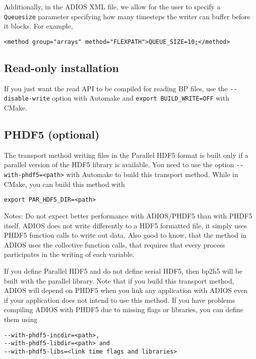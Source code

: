 Additionally, in the ADIOS XML file, we allow for the user to specify a \verb+Queuesize+ parameter specifying how many timesteps the writer can buffer before it blocks. For example, 

\begin{lstlisting}
<method group="arrays" method="FLEXPATH">QUEUE_SIZE=10;</method>
\end{lstlisting}



\subsection{Read-only installation}

If you just want the read API to be compiled for reading BP files, use the \verb+--disable-write+ option with Automake and \verb+export BUILD_WRITE=OFF+ with CMake.

\subsection{PHDF5 (optional)}

The transport method writing files in the Parallel HDF5 format is built only if 
a parallel version of the HDF5 library is available. You need to use the 
option \verb+--with-phdf5=<path>+ with Automake to build this transport method. 
While in CMake, you can build this method with
\begin{lstlisting}
export PAR_HDF5_DIR=<path>
\end{lstlisting}

\noindent Notes: Do not expect better performance with ADIOS/PHDF5 than with PHDF5 itself. ADIOS does not write differently to a HDF5 formatted file, it simply uses PHDF5 function calls to write out data. Also good to know, that the method in ADIOS uses the collective function calls, that requires that every process participates in the writing of each variable. 

If you define Parallel HDF5 and do not define serial HDF5, then bp2h5 will be built 
with the parallel library. 
Note that if you build this transport method, ADIOS will depend on PHDF5 when you 
link any application with ADIOS even if your application does not intend to 
use this method. 
If you have problems compiling ADIOS with PHDF5 due to missing flags or libraries, 
you can define them using 

\begin{lstlisting}
--with-phdf5-incdir=<path>,
--with-phdf5-libdir=<path> and 
--with-phdf5-libs=<link time flags and libraries>
\end{lstlisting}

